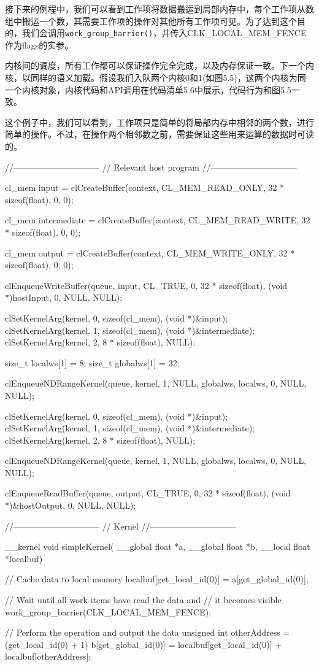 接下来的例程中，我们可以看到工作项将数据搬运到局部内存中，每个工作项从数组中搬运一个数，其需要工作项的操作对其他所有工作项可见。为了达到这个目的，我们会调用\texttt{work\_group\_barrier()}，并传入CLK\_\allowbreak{}LOCAL\_\allowbreak{}MEM\_\allowbreak{}FENCE作为flags的实参。

内核间的调度，所有工作都可以保证操作完全完成，以及内存保证一致。下一个内核，以同样的语义加载。假设我们入队两个内核0和1(如图5.5)，这两个内核为同一个内核对象，内核代码和API调用在代码清单5.6中展示，代码行为和图5.5一致。

这个例子中，我们可以看到，工作项只是简单的将局部内存中相邻的两个数，进行简单的操作。不过，在操作两个相邻数之前，需要保证这些用来运算的数据时可读的。

\begin{codebox}[cpp]
//------------------------------
//  Relevant host program
//------------------------------

cl_mem input = clCreateBuffer(context, CL_MEM_READ_ONLY, 32 * sizeof(float), 0, 0);

cl_mem intermediate = clCreateBuffer(context, CL_MEM_READ_WRITE, 32 * sizeof(float), 0, 0);

cl_mem output = clCreateBuffer(context, CL_MEM_WRITE_ONLY, 32 * sizeof(float), 0, 0);

clEnqueueWriteBuffer(queue, input, CL_TRUE, 0, 32 * sizeof(float), (void *)hostInput, 0, NULL, NULL);

clSetKernelArg(kernel, 0, sizeof(cl_mem), (void *)&input);
clSetKernelArg(kernel, 1, sizeof(cl_mem), (void *)&intermediate);
clSetKernelArg(kernel, 2, 8 * sizeof(float), NULL);

size_t localws[1] = {8};
size_t globalws[1] = {32};

clEnqueueNDRangeKernel(queue, kernel, 1, NULL, globalws, localws, 0, NULL, NULL);

clSetKernelArg(kernel, 0, sizeof(cl_mem), (void *)&input);
clSetKernelArg(kernel, 1, sizeof(cl_mem), (void *)&intermediate);
clSetKernelArg(kernel, 2, 8 * sizeof(float), NULL);

clEnqueueNDRangeKernel(queue, kernel, 1, NULL, globalws, localws, 0, NULL, NULL);

clEnqueueReadBuffer(queue, output, CL_TRUE, 0, 32 * sizeof(float), (void *)&hostOutput, 0, NULL, NULL);

//------------------------------
//  Kernel
//------------------------------

__kernel void simpleKernel(
  __global float *a,
  __global float *b,
  __local float *localbuf){

  // Cache data to local memory
  localbuf[get_local_id(0)] = a[get_global_id(0)];

  // Wait until all work-items have read the data and
  // it becomes visible
  work_group_barrier(CLK_LOCAL_MEM_FENCE);

  // Perform the operation and output the data
  unsigned int otherAddress = (get_local_id(0) + 1) %
  b[get_global_id(0)] = localbuf[get_local_id(0)] + localbuf[otherAddress];
}
\end{codebox}

